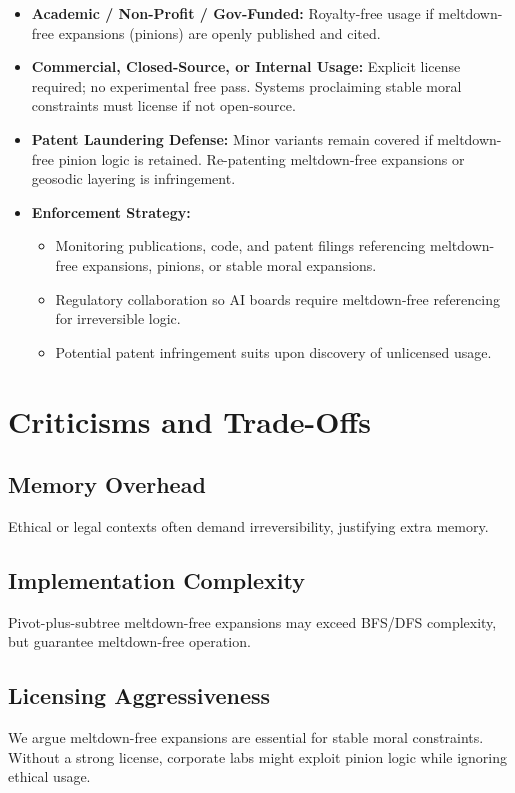 \documentclass[acmsmall]{acmart}
\theoremstyle{definition}
\theoremstyle{remark}
\begin{document}
\begin{itemize}
  \item \textbf{Academic / Non-Profit / Gov-Funded:}
        Royalty-free usage if meltdown-free expansions (pinions) are openly published
        and cited.
  \item \textbf{Commercial, Closed-Source, or Internal Usage:}
        Explicit license required; no experimental free pass. Systems proclaiming stable
        moral constraints must license if not open-source.
  \item \textbf{Patent Laundering Defense:}
        Minor variants remain covered if meltdown-free pinion logic is retained.
        Re-patenting meltdown-free expansions or geosodic layering is infringement.
  \item \textbf{Enforcement Strategy:}
    \begin{itemize}
      \item Monitoring publications, code, and patent filings referencing meltdown-free expansions, pinions, or stable moral expansions.
      \item Regulatory collaboration so AI boards require meltdown-free referencing for irreversible logic.
      \item Potential patent infringement suits upon discovery of unlicensed usage.
    \end{itemize}
\end{itemize}

\section{Criticisms and Trade-Offs}
\label{sec:criticisms}

\subsection{Memory Overhead}
Ethical or legal contexts often demand irreversibility, justifying extra memory.

\subsection{Implementation Complexity}
Pivot-plus-subtree meltdown-free expansions may exceed BFS/DFS complexity, but
guarantee meltdown-free operation.

\subsection{Licensing Aggressiveness}
We argue meltdown-free expansions are essential for stable moral constraints. Without
a strong license, corporate labs might exploit pinion logic while ignoring ethical usage.
\end{document}
